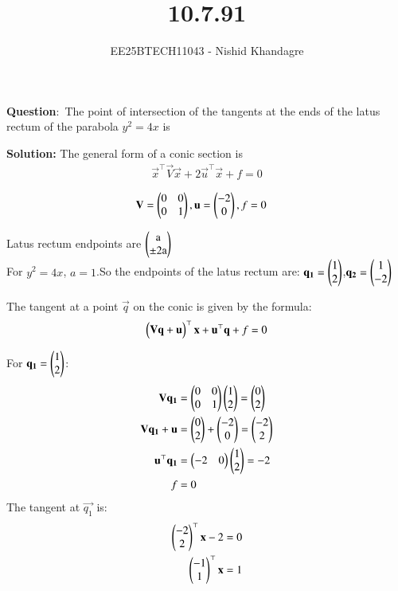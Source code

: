 \documentclass[journal]{IEEEtran}
\title{10.7.91}
\author{EE25BTECH11043 - Nishid Khandagre}
\begin{document}
\maketitle

\renewcommand{\thefigure}{\theenumi}
\renewcommand{\thetable}{\theenumi}


\textbf{Question}:\
The point of intersection of the tangents at the ends of the latus rectum of the parabola $y^2 = 4x$ is

\textbf{Solution: }
The general form of a conic section is\\
\begin{align}
\vec{x}^{\top}\vec{V}\vec{x} + 2\vec{u}^{\top}\vec{x} + f = 0
\end{align}

    \begin{align}
    \mathbf{V} &= \begin{pmatrix}0 & 0 \\ 0 & 1\end{pmatrix} , \mathbf{u}= \begin{pmatrix}-2 \\ 0\end{pmatrix} ,f= 0
    \end{align}
    
Latus rectum endpoints are $\begin{pmatrix}\text{a}\\\pm 2\text{a}\end{pmatrix}$\\
For $y^2 = 4x$, $a=1$.So the endpoints of the latus rectum are: $\mathbf{q_1} = \begin{pmatrix}1 \\ 2\end{pmatrix}$,$\mathbf{q_2} = \begin{pmatrix}1 \\ -2\end{pmatrix}$



The tangent at a point $\vec{q}$ on the conic is given by the formula:
\begin{align}
\begin{pmatrix}\mathbf{V}\mathbf{q} + \mathbf{u}\end{pmatrix}^{\top}\mathbf{x} + \mathbf{u}^{\top}\mathbf{q} + f = 0 
\end{align}

    For $\mathbf{q_1} = \begin{pmatrix}1 \\ 2\end{pmatrix}$:
    \begin{align}
    \mathbf{V}\mathbf{q_1} &= \begin{pmatrix}0 & 0 \\ 0 & 1\end{pmatrix}\begin{pmatrix}1 \\ 2\end{pmatrix} = \begin{pmatrix}0\\ 2\end{pmatrix} \\
    \mathbf{V}\mathbf{q_1} + \mathbf{u} &= \begin{pmatrix}0 \\ 2\end{pmatrix} + \begin{pmatrix}-2 \\ 0\end{pmatrix} = \begin{pmatrix}-2 \\ 2\end{pmatrix} \\
    \mathbf{u}^{\top}\mathbf{q_1} &= \begin{pmatrix}-2 & 0\end{pmatrix}\begin{pmatrix}1 \\ 2\end{pmatrix} = -2 \\
    f &= 0
    \end{align}
    The tangent at $\vec{q_1}$ is: 
    \begin{align}
    \begin{pmatrix}-2 \\ 2\end{pmatrix}^\top\mathbf{x} - 2 = 0\\
    \begin{pmatrix}-1 \\ 1\end{pmatrix}^\top\mathbf{x}=1\label{eq:tangent1}
    \end{align}
\end{document}
